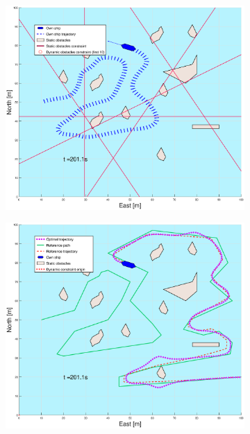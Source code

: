 \begin{figure}[ht]
\begin{subfigure}[b]{0.499\textwidth}
    \end{subfigure}
    \hfill
    \\
    \begin{subfigure}[b]{0.49\textwidth}
        \centering
        \includegraphics[width=\textwidth]{Images/Figures/skjergard_u_trafikk/_Simple_1fig1_time=201}
    \end{subfigure}
    \hfill
    \begin{subfigure}[b]{0.499\textwidth}
        \centering
        \includegraphics[width=\textwidth]{Images/Figures/skjergard_u_trafikk/_Simple_1fig999_time=201}

\end{subfigure}
\end{figure}
